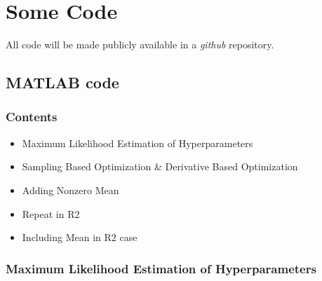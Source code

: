 \chapter{Some Code}
\label{app:code}

All code will be made publicly available in a \emph{github} repository.

\section{MATLAB code}
\subsection*{Contents}

\begin{itemize}
\setlength{\itemsep}{-1ex}
   \item Maximum Likelihood Estimation of Hyperparameters
   \item Sampling Based Optimization \& Derivative Based Optimization
   \item Adding Nonzero Mean
   \item Repeat in R2
   \item Including Mean in R2 case
\end{itemize}


\subsection*{Maximum Likelihood Estimation of Hyperparameters}

